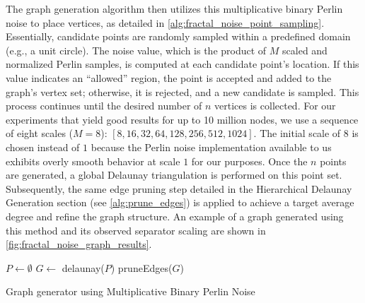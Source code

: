 The graph generation algorithm then utilizes this multiplicative binary Perlin noise to place vertices, as detailed in \cref{alg:fractal_noise_point_sampling}.
Essentially, candidate points are randomly sampled within a predefined domain (e.g., a unit circle). The noise value, which is the product of \(M\) scaled and normalized Perlin samples, is computed at each candidate point's location. If this value indicates an \enquote{allowed} region, the point is accepted and added to the graph's vertex set; otherwise, it is rejected, and a new candidate is sampled. This process continues until the desired number of \(n\) vertices is collected.
For our experiments that yield good results for up to 10 million nodes, we use a sequence of eight scales (\(M=8\)): \([8, 16, 32, 64, 128, 256, 512, 1024]\). The initial scale of \(8\) is chosen instead of \(1\) because the Perlin noise implementation available to us exhibits overly smooth behavior at scale \(1\) for our purposes.
Once the \(n\) points are generated, a global Delaunay triangulation is performed on this point set. Subsequently, the same edge pruning step detailed in the Hierarchical Delaunay Generation section (see \cref{alg:prune_edges}) is applied to achieve a target average degree and refine the graph structure.
An example of a graph generated using this method and its observed separator scaling are shown in \cref{fig:fractal_noise_graph_results}.

\begin{algorithm}[tbhp]
	\BlankLine
	\(P \longleftarrow \emptyset\)\;
	\(G \longleftarrow\) delaunay(\(P\))\;
	pruneEdges(\(G\))\;
	\;
	\caption{Graph generator using Multiplicative Binary Perlin Noise}
	\label{alg:fractal_noise_point_sampling}
\end{algorithm}


